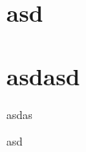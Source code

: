 \documentclass[11pt]{article}
\begin{document}
\section{asd}
\section{asdasd}
\begin{theorem}
asdas
\end{theorem}
asd
\end{document}
